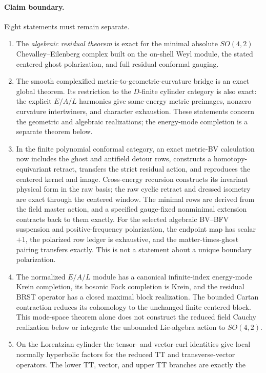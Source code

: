 \documentclass[11pt]{article}
\theoremstyle{definition}
\theoremstyle{remark}
\begin{document}
\paragraph{Claim boundary.}
Eight statements must remain separate.
\begin{enumerate}
\item The \emph{algebraic residual theorem} is exact for the minimal
absolute $SO(4,2)$ Chevalley--Eilenberg complex built on the on-shell Weyl
module, the stated centered ghost polarization, and full residual conformal
gauging.
\item The smooth complexified metric-to-geometric-curvature bridge is an
exact global theorem.  Its restriction to the $D$-finite cylinder category
is also exact: the explicit $E/A/L$ harmonics give same-energy metric
preimages, nonzero curvature intertwiners, and character exhaustion.
These statements concern the geometric and algebraic realizations; the
energy-mode completion is a separate theorem below.
\item In the finite polynomial conformal category, an exact metric-BV
calculation now includes the ghost and antifield detour rows, constructs a
homotopy-equivariant retract, transfers the strict residual action, and
reproduces the centered kernel and image.  Cross-energy recursion constructs
its invariant physical form in the raw basis; the raw cyclic retract and
dressed isometry are exact through the centered window.  The minimal rows
are derived from the field master action, and a specified gauge-fixed
nonminimal extension contracts back to them exactly.  For the selected
algebraic BV--BFV suspension and positive-frequency polarization, the endpoint
map has scalar $+1$, the polarized row ledger is exhaustive, and the
matter-times-ghost pairing transfers exactly.  This is not a statement about
a unique boundary polarization.
\item The normalized $E/A/L$ module has a canonical infinite-index
energy-mode Krein completion, its bosonic Fock completion is Krein, and the
residual BRST operator has a closed maximal block realization.  The bounded
Cartan contraction reduces its cohomology to the unchanged finite centered
block.  This mode-space theorem alone does not construct the reduced field
Cauchy realization below or integrate the unbounded Lie-algebra action to
$SO(4,2)$.
\item On the Lorentzian cylinder the tensor- and vector-curl identities give
local normally hyperbolic factors for the reduced TT and transverse-vector
operators.  The lower TT, vector, and upper TT branches are exactly the

\end{enumerate}
\end{document}
